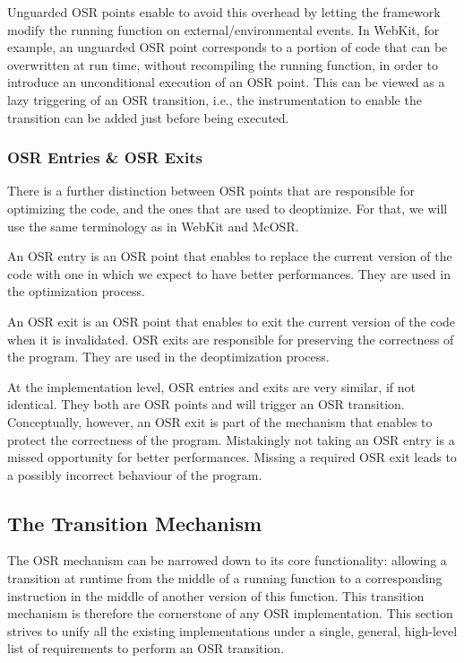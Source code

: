 Unguarded OSR points enable to avoid this overhead by letting the framework modify the running function on external/environmental events.
In WebKit\cite{WebKitURL}, for example, an unguarded OSR point corresponds to a portion of code that can be overwritten at run time, without recompiling the running function, in order to introduce an unconditional execution of an OSR point.
This can be viewed as a lazy triggering of an OSR transition, i.e., the instrumentation to enable the transition can be added just before being executed.\\

\subsubsection{OSR Entries \& OSR Exits}

There is a further distinction between OSR points that are responsible for optimizing the code, and the ones that are used to deoptimize.
For that, we will use the same terminology as in WebKit\cite{WebKitURL} and McOSR\cite{lameed2013modular}.

\begin{definition}\label{OSREntryDefinition}
An OSR entry is an OSR point that enables to replace the current version of the code with one in which we expect to have better performances.
They are used in the optimization process.
\end{definition}

\begin{definition}
An OSR exit is an OSR point that enables to exit the current version of the code when it is invalidated.
OSR exits are responsible for preserving the correctness of the program.
They are used in the deoptimization process.
\end{definition}

At the implementation level, OSR entries and exits are very similar, if not identical. 
They both are OSR points and will trigger an OSR transition.
Conceptually, however, an OSR exit is part of the mechanism that enables to protect the correctness of the program.
Mistakingly not taking an OSR entry is a missed opportunity for better performances.
Missing a required OSR exit leads to a possibly incorrect behaviour of the program.\\

\subsection{The Transition Mechanism}
The OSR mechanism can be narrowed down to its core functionality: allowing a transition at runtime from the middle of a running function to a corresponding instruction in the middle of another version of this function.
This transition mechanism is therefore the cornerstone of any OSR implementation.
This section strives to unify all the existing implementations under a single, general, high-level list of requirements to perform an OSR transition.\\

